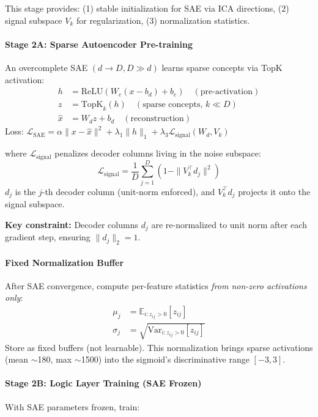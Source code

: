 \documentclass[11pt,twocolumn]{article}
\begin{document}
This stage provides: (1) stable initialization for SAE via ICA directions, (2) signal subspace $V_k$ for regularization, (3) normalization statistics.

\paragraph{Stage 2A: Sparse Autoencoder Pre-training}
An overcomplete SAE $(d \to D, D \gg d)$ learns sparse concepts via TopK activation:
\begin{align}
h &= \text{ReLU}(W_e(x - b_d) + b_e) \quad (\text{pre-activation}) \\
z &= \text{TopK}_k(h) \quad (\text{sparse concepts, $k \ll D$}) \\
\hat{x} &= W_d z + b_d \quad (\text{reconstruction})
\end{align}
Loss: $\mathcal{L}_\text{SAE} = \alpha \|x - \hat{x}\|^2 + \lambda_1 \|h\|_1 + \lambda_3 \mathcal{L}_\text{signal}(W_d, V_k)$

where $\mathcal{L}_\text{signal}$ penalizes decoder columns living in the noise subspace:
\begin{equation}
\mathcal{L}_\text{signal} = \frac{1}{D}\sum_{j=1}^D \left(1 - \|V_k^\top d_j\|^2\right)
\end{equation}
$d_j$ is the $j$-th decoder column (unit-norm enforced), and $V_k^\top d_j$ projects it onto the signal subspace.

\textbf{Key constraint:} Decoder columns $d_j$ are re-normalized to unit norm after each gradient step, ensuring $\|d_j\|_2 = 1$.

\paragraph{Fixed Normalization Buffer}
After SAE convergence, compute per-feature statistics \emph{from non-zero activations only}:
\begin{align}
\mu_j &= \mathbb{E}_{i: z_{ij} > 0}[z_{ij}] \\
\sigma_j &= \sqrt{\text{Var}_{i: z_{ij} > 0}[z_{ij}]}
\end{align}
Store as fixed buffers (not learnable). This normalization brings sparse activations (mean $\sim$180, max $\sim$1500) into the sigmoid's discriminative range $[-3, 3]$.

\paragraph{Stage 2B: Logic Layer Training (SAE Frozen)}
With SAE parameters frozen, train:
\end{document}
